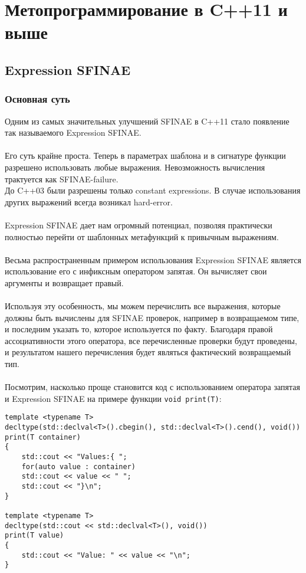 \section{Метопрограммирование в C++11 и выше}
	\subsection{Expression SFINAE}
		\subsubsection{Основная суть}
Одним из самых значительных улучшений SFINAE в C++11 стало появление так называемого Expression SFINAE. \\\\
Его суть крайне проста.
Теперь в параметрах шаблона и в сигнатуре функции разрешено использовать любые выражения.
Невозможность вычисления трактуется как SFINAE-failure. \\
До C++03 были разрешены только constant expressions. 
В случае использования других выражений всегда возникал hard-error. \\\\
Expression SFINAE дает нам огромный потенциал, позволяя практически полностью перейти от шаблонных метафункций к привычным выражениям. \\\\
Весьма распространенным примером использования Expression SFINAE является использование его с инфиксным оператором запятая. 
Он вычисляет свои аргументы и возвращает правый.\\\\
Используя эту особенность, мы можем перечислить все выражения, которые должны быть вычислены для SFINAE проверок, например в возвращаемом типе, и последним указать то, которое используется по факту. 
Благодаря правой ассоциативности этого оператора, все перечисленные проверки будут проведены, и результатом нашего перечисления будет являться фактический возвращаемый тип.\\\\
Посмотрим, насколько проще становится код с использованием оператора запятая и Expression SFINAE на примере функции \texttt{void print(T)}:
\begin{verbatim}
template <typename T>
decltype(std::declval<T>().cbegin(), std::declval<T>().cend(), void())
print(T container)
{
	std::cout << "Values:{ ";
	for(auto value : container)
	std::cout << value << " ";
	std::cout << "}\n";
}

template <typename T>
decltype(std::cout << std::declval<T>(), void())
print(T value)
{
	std::cout << "Value: " << value << "\n";
}	
\end{verbatim}
